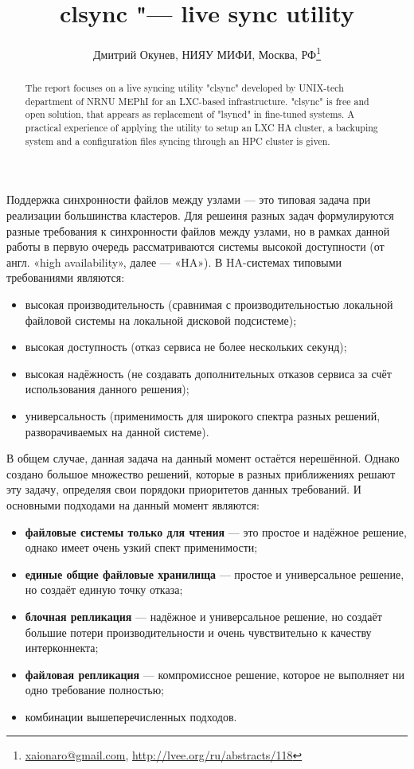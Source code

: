 \documentclass[10pt, a5paper]{article}
\begin{document}
\title{clsync "--- live sync utility}
\author{Дмитрий Окунев, НИЯУ МИФИ, Москва, РФ\footnote{\url{xaionaro@gmail.com}, \url{http://lvee.org/ru/abstracts/118}}}
\maketitle
\begin{abstract}
The report focuses on a live syncing utility "clsync" developed by UNIX-tech department of NRNU MEPhI for an LXC-based infrastructure. "clsync" is free and open solution, that appears as replacement of "lsyncd" in fine-tuned systems. A practical experience of applying the utility to setup an LXC HA cluster, a backuping system and a configuration files syncing through an HPC cluster is given.
\end{abstract}
Поддержка синхронности файлов между узлами — это типовая задача при реализации большинства кластеров. Для решеиня разных задач формулируются разные требования к синхронности файлов между узлами, но в рамках данной работы в первую очередь рассматриваются системы высокой доступности (от англ. «high availability», далее — «HA»). В HA-системах типовыми требованиями являются:

\begin{itemize}
  \item высокая производительность (сравнимая с производительностью локальной файловой системы на локальной дисковой подсистеме);
  \item высокая доступность (отказ сервиса не более нескольких секунд);
  \item высокая надёжность (не создавать дополнительных отказов сервиса за счёт использования данного решения);
  \item универсальность (применимость для широкого спектра разных решений, разворачиваемых на данной системе).
\end{itemize}

В общем случае, данная задача на данный момент остаётся нерешённой. Однако создано большое множество решений, которые в разных приближениях решают эту задачу, определяя свои порядоки приоритетов данных требований. И основными подходами на данный момент являются:

\begin{itemize}
  \item \textbf{файловые системы только для чтения} — это простое и надёжное решение, однако имеет очень узкий спект применимости;
  \item \textbf{единые общие файловые хранилища} — простое и универсальное решение, но создаёт единую точку отказа;
  \item \textbf{блочная репликация} — надёжное и универсальное решение, но создаёт большие потери производительности и очень чувствительно к качеству интерконнекта;
  \item \textbf{файловая репликация} — компромиссное решение, которое не выполняет ни одно требование полностью;
  \item комбинации вышеперечисленных подходов.
\end{itemize}
\end{document}
